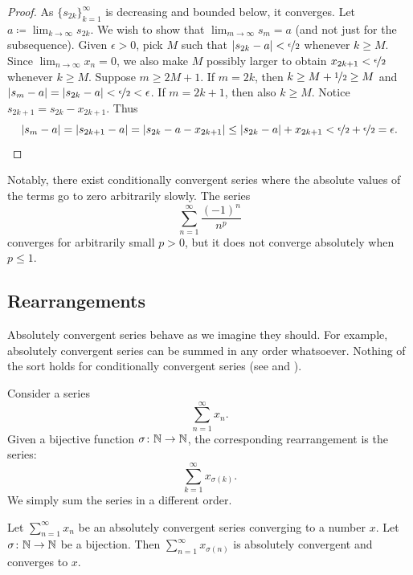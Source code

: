 \begin{proof}
As $\{ s_{2k} \}_{k=1}^\infty$ is decreasing and bounded below, it converges.
Let $a \coloneqq \lim_{k\to\infty} s_{2k}$.
We wish to show that $\lim_{m\to\infty} s_m = a$ (and not just for the subsequence).
Given $\epsilon > 0$, pick $M$ such that $\left\lvert {s_{2k}-a} \right\rvert <
\nicefrac{\epsilon}{2}$ whenever $k \geq M$.
Since $\lim_{n\to\infty} x_n = 0$, we also
make $M$ possibly larger
to obtain
$x_{2k+1} < \nicefrac{\epsilon}{2}$ whenever $k \geq M$.  
Suppose $m \geq 2M+1$.  If $m=2k$, then $k \geq M+\nicefrac{1}{2} \geq M$ and
$\left\lvert {s_{m}-a} \right\rvert=\left\lvert {s_{2k}-a} \right\rvert < \nicefrac{\epsilon}{2} < \epsilon$.
If $m=2k+1$, then also $k \geq M$.  Notice
$s_{2k+1} = s_{2k} - x_{2k+1}$.
Thus
\begin{equation*}
\left\lvert {s_{m}-a} \right\rvert = 
\left\lvert {s_{2k+1}-a} \right\rvert = 
\left\lvert {s_{2k}-a - x_{2k+1}} \right\rvert \leq
\left\lvert {s_{2k}-a} \right\rvert + x_{2k+1} < 
\nicefrac{\epsilon}{2}+ \nicefrac{\epsilon}{2} = \epsilon .  \qedhere
\end{equation*}
\end{proof}

Notably, there exist conditionally convergent series
where the absolute values of the terms go to zero arbitrarily slowly.
The series
\begin{equation*}
\sum_{n=1}^\infty \frac{{(-1)}^n}{n^p}
\end{equation*}
converges for arbitrarily small $p > 0$, but it does not converge
absolutely when $p \leq 1$.

\subsection{Rearrangements}

Absolutely convergent series behave as we imagine they should.  For example,
absolutely convergent series can be summed in any order whatsoever.  Nothing
of the sort holds for conditionally convergent series
(see 
and ).

Consider a series
\begin{equation*}
\sum_{n=1}^\infty x_n .
\end{equation*}
Given a bijective function $\sigma \colon {\mathbb{N}} \to {\mathbb{N}}$, the corresponding
rearrangement is the 
series:
\begin{equation*}
\sum_{k=1}^\infty x_{\sigma(k)} .
\end{equation*}
We simply sum the series in a different order.

\begin{prop}
Let $\sum_{n=1}^\infty x_n$ be an absolutely convergent series converging to a number
$x$.  Let $\sigma \colon {\mathbb{N}} \to {\mathbb{N}}$ be a bijection.  Then
$\sum_{n=1}^\infty x_{\sigma(n)}$ is absolutely convergent and converges to $x$.
\end{prop}


